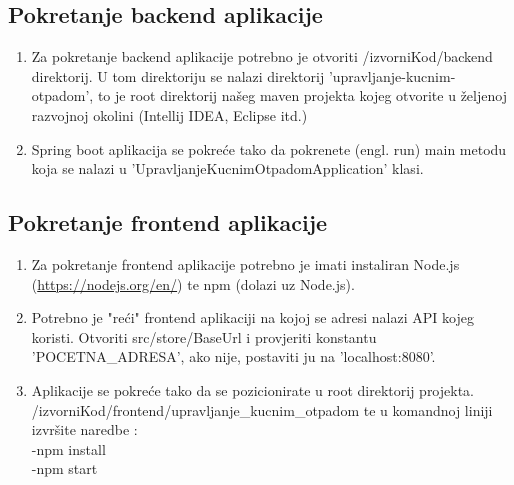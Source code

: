 				\subsection{Pokretanje backend aplikacije}
				\begin{enumerate}
					\item Za pokretanje backend aplikacije potrebno je otvoriti /izvorniKod/backend direktorij. U tom direktoriju se nalazi direktorij 'upravljanje-kucnim-otpadom',
					to je root direktorij našeg maven projekta kojeg otvorite u željenoj razvojnoj okolini (Intellij IDEA, Eclipse itd.)
					\item Spring boot aplikacija se pokreće tako da pokrenete (engl. run) main metodu koja se nalazi u 'UpravljanjeKucnimOtpadomApplication' klasi. 
					
				\end{enumerate}
			
				\subsection{Pokretanje frontend aplikacije}
				\begin{enumerate}
					\item Za pokretanje frontend aplikacije potrebno je imati instaliran Node.js\\
					 (\url{https://nodejs.org/en/}) te npm (dolazi uz Node.js).
					 \item Potrebno je "reći" frontend aplikaciji na kojoj se adresi nalazi API kojeg koristi. Otvoriti src/store/BaseUrl i provjeriti konstantu 'POCETNA\_ADRESA', ako nije, postaviti ju na 'localhost:8080'.
					\item Aplikacije se pokreće tako da se pozicionirate u root direktorij projekta. /izvorniKod/frontend/upravljanje\_kucnim\_otpadom te u komandnoj
					liniji izvršite naredbe : \\
					-npm install \\
					-npm start
			
				\end{enumerate}
			
			
			\eject 